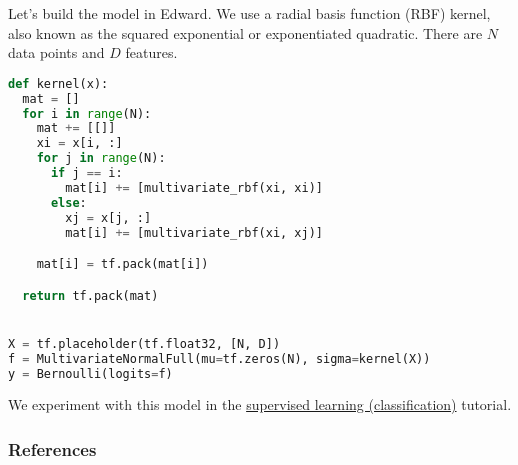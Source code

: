 Let's build the model in Edward. We use a radial basis function (RBF)
kernel, also known as the squared exponential or exponentiated
quadratic. There are $N$ data points and $D$ features.
\begin{lstlisting}[language=Python]
def kernel(x):
  mat = []
  for i in range(N):
    mat += [[]]
    xi = x[i, :]
    for j in range(N):
      if j == i:
        mat[i] += [multivariate_rbf(xi, xi)]
      else:
        xj = x[j, :]
        mat[i] += [multivariate_rbf(xi, xj)]

    mat[i] = tf.pack(mat[i])

  return tf.pack(mat)


X = tf.placeholder(tf.float32, [N, D])
f = MultivariateNormalFull(mu=tf.zeros(N), sigma=kernel(X))
y = Bernoulli(logits=f)
\end{lstlisting}

We experiment with this model in the
\href{/tutorials/supervised-classification}{supervised learning (classification)} tutorial.

\subsubsection{References}\label{references}
